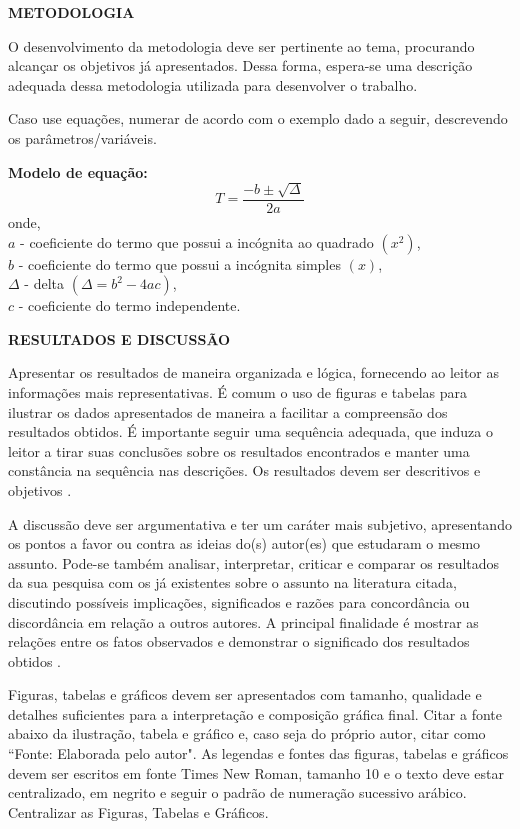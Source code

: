 \documentclass[11pt,a4paper]{article}
\begin{document}
\vspace{0.5cm}
\noindent
{\fontsize{12}{12}\selectfont
\textbf{METODOLOGIA}}

O desenvolvimento da metodologia deve ser pertinente ao tema, procurando alcançar os objetivos já apresentados. Dessa forma, espera-se uma descrição adequada dessa metodologia utilizada para desenvolver o trabalho. 

Caso use equações, numerar de acordo com o exemplo dado a seguir, descrevendo os parâmetros/variáveis. 

\noindent 
\textbf{Modelo de equação:}
\begin{equation}
T=\frac{-b\pm\sqrt{\Delta}}{2a}
\end{equation}
onde,\\
$a$ - coeficiente do termo que possui a incógnita ao quadrado $(x^2)$,\\
$b$ - coeficiente do termo que possui a incógnita simples $(x)$,\\
$\Delta$ - delta $(\Delta=b^2-4ac)$,\\
$c$ - coeficiente do termo independente.


\vspace{0.5cm}
\noindent
{\fontsize{12}{12}\selectfont
\textbf{RESULTADOS E DISCUSSÃO}}

Apresentar os resultados de maneira organizada e lógica, fornecendo ao leitor as informações mais representativas. É comum o uso de figuras e tabelas para ilustrar os dados apresentados de maneira a facilitar a compreensão dos resultados obtidos. É importante seguir uma sequência adequada, que induza o leitor a tirar suas conclusões sobre os resultados encontrados e manter uma constância na sequência nas descrições. Os resultados devem ser descritivos e objetivos \cite{DC:08}.

A discussão deve ser argumentativa e ter um caráter mais subjetivo, apresentando os pontos a favor ou contra as ideias do(s) autor(es) que estudaram o mesmo assunto. Pode-se também analisar, interpretar, criticar e comparar os resultados da sua pesquisa com os já existentes sobre o assunto na literatura citada, discutindo possíveis implicações, significados e razões para concordância ou discordância em relação a outros autores. A principal finalidade é mostrar as relações entre os fatos observados e demonstrar o significado dos resultados obtidos  \cite{DC:08}.

Figuras, tabelas e gráficos devem ser apresentados com tamanho, qualidade e detalhes suficientes para a interpretação e composição gráfica final. Citar a fonte abaixo da ilustração, tabela e gráfico e, caso seja do próprio autor, citar como ``Fonte: Elaborada pelo autor". As legendas e fontes das figuras, tabelas e gráficos devem ser escritos em fonte Times New Roman, tamanho 10 e o texto deve estar centralizado, em negrito e seguir o padrão de numeração sucessivo arábico. Centralizar as Figuras, Tabelas e Gráficos.
\end{document}
